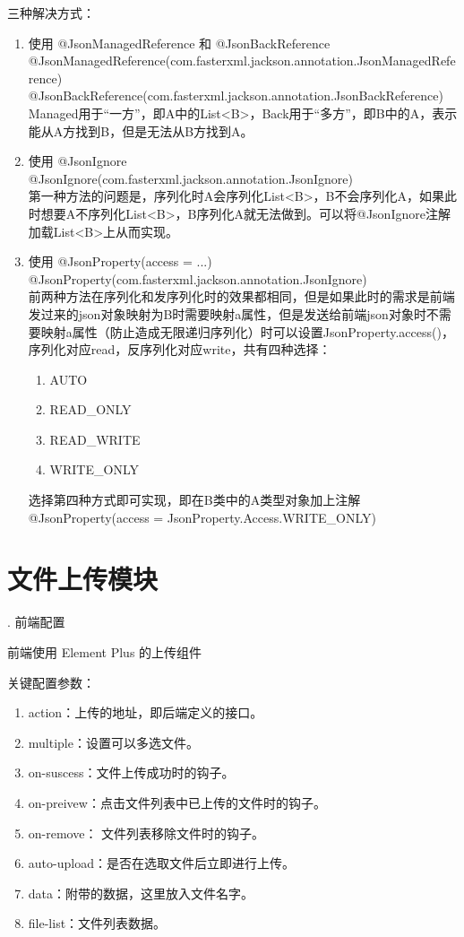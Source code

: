 三种解决方式：
\begin{enumerate}
  \item 使用 @JsonManagedReference 和 @JsonBackReference\\
        @JsonManagedReference(com.fasterxml.jackson.annotation.JsonManagedReference)\\
        @JsonBackReference(com.fasterxml.jackson.annotation.JsonBackReference)\\
        Managed用于“一方”，即A中的List<B>，Back用于“多方”，即B中的A，表示能从A方找到B，但是无法从B方找到A。
  \item 使用 @JsonIgnore\\
        @JsonIgnore(com.fasterxml.jackson.annotation.JsonIgnore)\\
        第一种方法的问题是，序列化时A会序列化List<B>，B不会序列化A，如果此时想要A不序列化List<B>，B序列化A就无法做到。可以将@JsonIgnore注解加载List<B>上从而实现。
  \item 使用 @JsonProperty(access = ...)\\
        @JsonProperty(com.fasterxml.jackson.annotation.JsonIgnore)\\
        前两种方法在序列化和发序列化时的效果都相同，但是如果此时的需求是前端发过来的json对象映射为B时需要映射a属性，但是发送给前端json对象时不需要映射a属性（防止造成无限递归序列化）时可以设置JsonProperty.access()，序列化对应read，反序列化对应write，共有四种选择：
        \begin{enumerate}
          \item AUTO
          \item READ\_ONLY
          \item READ\_WRITE
          \item WRITE\_ONLY
        \end{enumerate}
        选择第四种方式即可实现，即在B类中的A类型对象加上注解 @JsonProperty(access = JsonProperty.Access.WRITE\_ONLY)
\end{enumerate}

\section{文件上传模块}

. 前端配置

前端使用 Element Plus 的上传组件

关键配置参数：
\begin{enumerate}
  \item action：上传的地址，即后端定义的接口。
  \item multiple：设置可以多选文件。
  \item on-suscess：文件上传成功时的钩子。
  \item on-preivew：点击文件列表中已上传的文件时的钩子。
  \item on-remove：	文件列表移除文件时的钩子。
  \item auto-upload：是否在选取文件后立即进行上传。
  \item data：附带的数据，这里放入文件名字。
  \item file-list：文件列表数据。
\end{enumerate}

